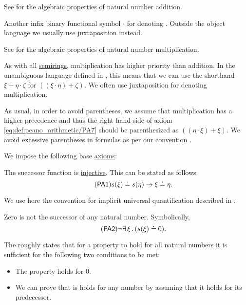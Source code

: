\begin{definition}
\begin{thmenum}[series=def:peano_arithmetic]
    See  for the algebraic properties of natural number addition.

     Another infix binary functional symbol \( \cdot \) for denoting . Outside the object language we usually use juxtaposition instead.

    See  for the algebraic properties of natural number multiplication.

    As with all \hyperref[def:semiring]{semirings}, multiplication has higher priority than addition. In the unambiguous language defined in , this means that we can use the shorthand \( \xi + \eta \cdot \zeta \) for \( ((\xi \cdot \eta) + \zeta) \). We often use juxtaposition for denoting multiplication.
  \end{thmenum}

  As usual, in order to avoid parentheses, we assume that multiplication has a higher precedence and thus the right-hand side of axiom \eqref{eq:def:peano_arithmetic/PA7} should be parenthesized as \( ((\eta \cdot \xi) + \xi) \). We avoid excessive parentheses in formulas as per our convention .

  We impose the following base \hyperref[def:first_order_theory]{axioms}:
  \begin{thmenum}[resume=def:peano_arithmetic]
     The successor function is \hyperref[thm:function_invertibility_categorical/nonempty_left_invertible]{injective}. This can be stated as follows:
    \begin{equation}\label{eq:def:peano_arithmetic/PA1}\tag{\logic{PA1}}
      s(\xi) \doteq s(\eta) \rightarrow \xi \doteq \eta.
    \end{equation}

    We use here the convention for implicit universal quantification described in .

     Zero is not the successor of any natural number. Symbolically,
    \begin{equation}\label{eq:def:peano_arithmetic/PA2}\tag{\logic{PA2}}
      \neg \qexists \xi (s(\xi) \doteq 0).
    \end{equation}

     The  roughly states that for a property to hold for all natural numbers it is sufficient for the following two conditions to be met:
    \begin{itemize}
      \item The property holds for \( 0 \).
      \item We can prove that is holds for any number by assuming that it holds for its predecessor.
    \end{itemize}


\end{thmenum}
\end{definition}
